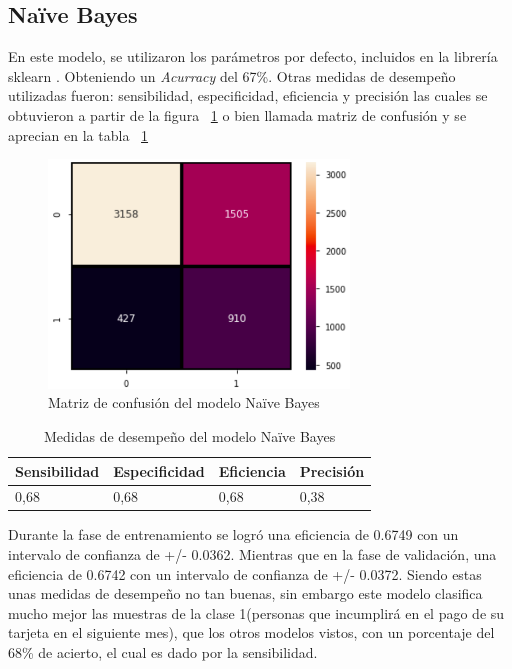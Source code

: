 \documentclass[conference]{IEEEtran}
\begin{document}
\subsection{Naïve Bayes}
En este modelo, se utilizaron los parámetros por defecto, incluidos en la librería sklearn \cite{sklearnGaussian}. Obteniendo un \textit{Acurracy} del 67\%. Otras medidas de desempeño utilizadas fueron: sensibilidad, especificidad, eficiencia y precisión las cuales se obtuvieron a partir de la figura ~\ref{fig:confusionMatrizGNB} o bien llamada matriz de confusión y se aprecian en la tabla  ~\ref{tab:medidasGNB}
\begin{center}
    \begin{figure}[H]
        \hfill
     \centerline{\includegraphics[width=8cm]{matrixConfusionGNB.png}}
    \caption{Matriz de confusión del modelo Naïve Bayes}
    \label{fig:confusionMatrizGNB}
    \end{figure}  
\end{center}
\begin{table}[H]
\centering
\begin{tabular}{|l|l|l|l|}
\hline
Sensibilidad & Especificidad & \multicolumn{1}{r|}{Eficiencia} & Precisión \\ \hline
0,68         & 0,68          & 0,68                            & 0,38      \\ \hline
\end{tabular}
\caption{Medidas de desempeño del modelo Naïve Bayes}
\label{tab:medidasGNB}
\end{table}
Durante la fase de entrenamiento se logró una eficiencia de 0.6749 con un intervalo de confianza de +/- 0.0362. Mientras que en la fase de validación, una eficiencia de 0.6742 con un intervalo de confianza de +/-  0.0372. Siendo estas unas medidas de desempeño no tan buenas, sin embargo este modelo clasifica mucho mejor las muestras de la clase 1(personas que incumplirá en el pago de su tarjeta en el siguiente mes), que los otros modelos vistos, con un porcentaje del 68\% de acierto, el cual es dado por la sensibilidad.
\end{document}
